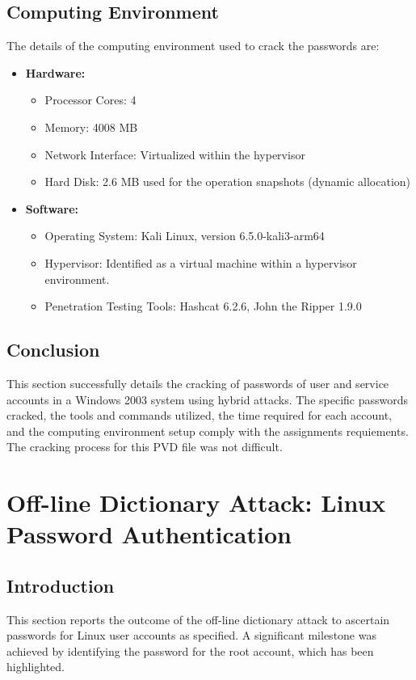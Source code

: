 \documentclass{article}
\begin{document}
\subsection{Computing Environment}
The details of the computing environment used to crack the passwords are:

\begin{itemize}
    \item \textbf{Hardware:}
    \begin{itemize}
        \item Processor Cores: 4
        \item Memory: 4008 MB
        \item Network Interface: Virtualized within the hypervisor
        \item Hard Disk: 2.6 MB used for the operation snapshots (dynamic allocation)
    \end{itemize}
    \item \textbf{Software:}
    \begin{itemize}
        \item Operating System: Kali Linux, version 6.5.0-kali3-arm64
        \item Hypervisor: Identified as a virtual machine within a hypervisor environment.
        \item Penetration Testing Tools: Hashcat 6.2.6, John the Ripper 1.9.0
    \end{itemize}
\end{itemize}

\subsection{Conclusion}

This section successfully details the cracking of passwords of user and service accounts in a Windows 2003 system using hybrid attacks. The specific passwords cracked, the tools and commands utilized, the time required for each account, and the computing environment setup comply with the assignments requiements. The cracking process for this PVD file was not difficult. 

\section{Off-line Dictionary Attack: Linux Password Authentication}

\subsection{Introduction}
This section reports the outcome of the off-line dictionary attack to ascertain passwords for Linux user accounts as specified. A significant milestone was achieved by identifying the password for the root account, which has been highlighted.
\end{document}
